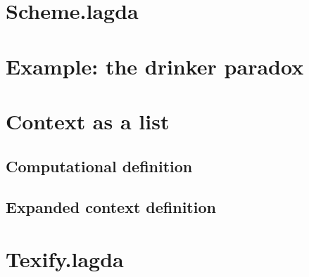 \documentclass{article}
\theoremstyle{definition}
\theoremstyle{plain}
\begin{document}
\section{Scheme.lagda}


\section{Example: the drinker paradox}


{}


\begin{appendices}

\section{Context as a list}
\subsection{Computational definition}

\subsection{Expanded context definition}



\section{Texify.lagda}


\end{appendices}
\end{document}
